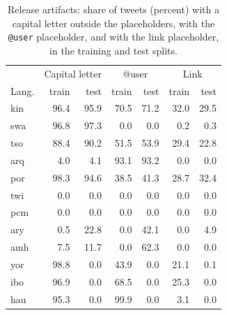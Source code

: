 \documentclass[11pt]{article}
\begin{document}
\begin{table}[t]
\centering
\scriptsize
\setlength{\tabcolsep}{3.5pt}
\begin{tabular}{lrrrrrr}
\toprule
 & \multicolumn{2}{c}{Capital letter} & \multicolumn{2}{c}{@user} & \multicolumn{2}{c}{Link} \\
Lang. & train & test & train & test & train & test \\
\midrule
kin & 96.4 & 95.9 & 70.5 & 71.2 & 32.0 & 29.5 \\
swa & 96.8 & 97.3 & 0.0 & 0.0 & 0.2 & 0.3 \\
tso & 88.4 & 90.2 & 51.5 & 53.9 & 29.4 & 22.8 \\
arq & 4.0 & 4.1 & 93.1 & 93.2 & 0.0 & 0.0 \\
por & 98.3 & 94.6 & 38.5 & 41.3 & 28.7 & 32.4 \\
twi & 0.0 & 0.0 & 0.0 & 0.0 & 0.0 & 0.0 \\
pcm & 0.0 & 0.0 & 0.0 & 0.0 & 0.0 & 0.0 \\
ary & 0.5 & 22.8 & 0.0 & 42.1 & 0.0 & 4.9 \\
amh & 7.5 & 11.7 & 0.0 & 62.3 & 0.0 & 0.0 \\
yor & 98.8 & 0.0 & 43.9 & 0.0 & 21.1 & 0.1 \\
ibo & 96.9 & 0.0 & 68.5 & 0.0 & 25.3 & 0.0 \\
hau & 95.3 & 0.0 & 99.9 & 0.0 & 3.1 & 0.0 \\
\bottomrule
\end{tabular}
\caption{Release artifacts: share of tweets (percent) with a capital letter outside the placeholders, with the \texttt{@user} placeholder, and with the link placeholder, in the training and test splits.}
\label{tab:artifacts}
\end{table}
\end{document}
